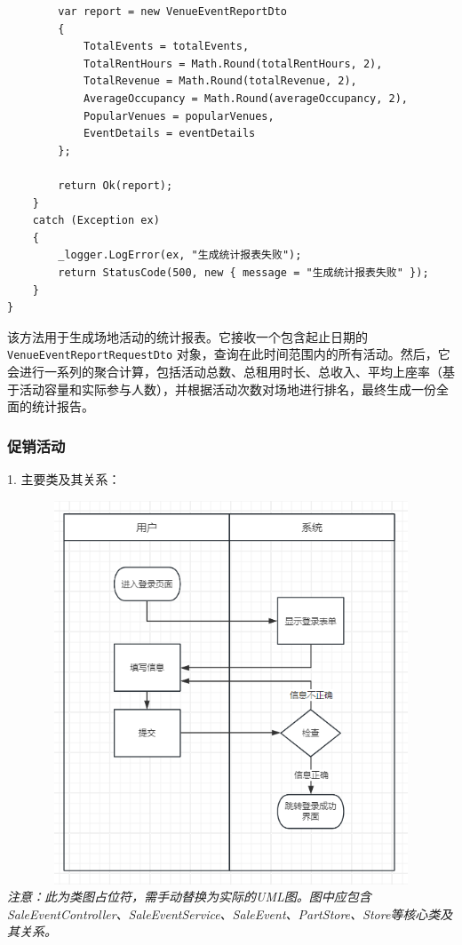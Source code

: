 \documentclass[]{article}
\begin{document}
\begin{verbatim}
        var report = new VenueEventReportDto
        {
            TotalEvents = totalEvents,
            TotalRentHours = Math.Round(totalRentHours, 2),
            TotalRevenue = Math.Round(totalRevenue, 2),
            AverageOccupancy = Math.Round(averageOccupancy, 2),
            PopularVenues = popularVenues,
            EventDetails = eventDetails
        };

        return Ok(report);
    }
    catch (Exception ex)
    {
        _logger.LogError(ex, "生成统计报表失败");
        return StatusCode(500, new { message = "生成统计报表失败" });
    }
}
\end{verbatim}
该方法用于生成场地活动的统计报表。它接收一个包含起止日期的 \texttt{VenueEventReportRequestDto} 对象，查询在此时间范围内的所有活动。然后，它会进行一系列的聚合计算，包括活动总数、总租用时长、总收入、平均上座率（基于活动容量和实际参与人数），并根据活动次数对场地进行排名，最终生成一份全面的统计报告。

\subsubsection{促销活动}

1. 主要类及其关系：

\includegraphics[width=6.2in,height=4.5in]{media/media/image1.png} %
\textit{注意：此为类图占位符，需手动替换为实际的UML图。图中应包含SaleEventController、SaleEventService、SaleEvent、PartStore、Store等核心类及其关系。}
\end{document}
